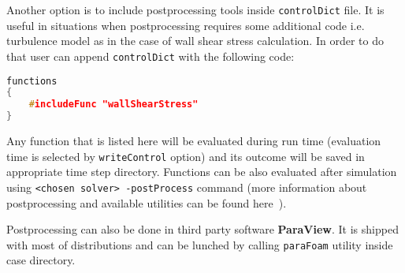             Another option is to include postprocessing tools inside \texttt{controlDict} file. It is useful in situations when postprocessing requires some additional code i.e. turbulence model as in the case of wall shear stress calculation.
            In order to do that user can append \texttt{controlDict} with the following code:
            \begin{lstlisting}[language=C++]
functions
{
    #includeFunc "wallShearStress"
}
            \end{lstlisting}
            Any function that is listed here will be evaluated during run time (evaluation time is selected by \texttt{writeControl} option) and its outcome will be saved in appropriate time step directory.
            Functions can be also evaluated after simulation using \texttt{<chosen solver> -postProcess} command (more information about postprocessing and available utilities can be found here~\cite{postProc}).
        
            Postprocessing can also be done in third party software \textbf{ParaView}. It is shipped with most of \oFoam distributions and can be lunched by calling \texttt{paraFoam} utility inside case directory.
        
